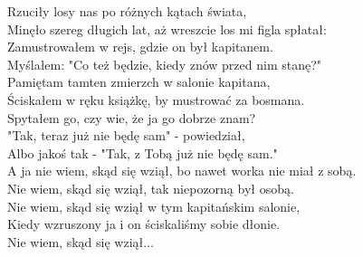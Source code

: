 Rzuciły losy nas po różnych kątach świata, \\
Minęło szereg długich lat, aż wreszcie los mi figla spłatał: \\
Zamustrowałem w rejs, gdzie on był kapitanem. \\
Myślałem: "Co też będzie, kiedy znów przed nim stanę?" \\

Pamiętam tamten zmierzch w salonie kapitana, \\
Ściskałem w ręku książkę, by mustrować za bosmana. \\
Spytałem go, czy wie, że ja go dobrze znam? \\
"Tak, teraz już nie będę sam" - powiedział, \\
Albo jakoś tak - "Tak, z Tobą już nie będę sam." \\

A ja nie wiem, skąd się wziął, bo nawet worka nie miał z sobą. \\
Nie wiem, skąd się wziął, tak niepozorną był osobą. \\
Nie wiem, skąd się wziął w tym kapitańskim salonie, \\
Kiedy wzruszony ja i on ściskaliśmy sobie dłonie. \\

Nie wiem, skąd się wziął...